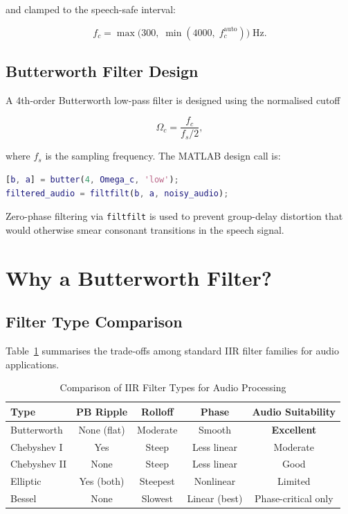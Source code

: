 \documentclass[conference]{IEEEtran}
\begin{document}
and clamped to the speech-safe interval:

\begin{equation}
  f_c = \max\bigl(300,\;\min(4000,\;f_c^{\text{auto}})\bigr)\;\text{Hz}.
  \label{eq:clamp}
\end{equation}

\subsection{Butterworth Filter Design}

A 4th-order Butterworth low-pass filter is designed using the normalised
cutoff

\begin{equation}
  \Omega_c = \frac{f_c}{f_s / 2},
  \label{eq:normalised}
\end{equation}

where $f_s$ is the sampling frequency. The MATLAB design call is:

\begin{lstlisting}[language=Matlab, caption={Butterworth filter design in MATLAB.}]
[b, a] = butter(4, Omega_c, 'low');
filtered_audio = filtfilt(b, a, noisy_audio);
\end{lstlisting}

Zero-phase filtering via \texttt{filtfilt} is used to prevent group-delay
distortion that would otherwise smear consonant transitions in the speech
signal.

\section{Why a Butterworth Filter?}

\subsection{Filter Type Comparison}

Table~\ref{tab:filters} summarises the trade-offs among standard IIR filter
families for audio applications.

\begin{table}[htbp]
\caption{Comparison of IIR Filter Types for Audio Processing}
\label{tab:filters}
\centering
\begin{tabular}{lcccc}
\toprule
\textbf{Type} & \textbf{PB Ripple} & \textbf{Rolloff} & \textbf{Phase} & \textbf{Audio Suitability} \\
\midrule
Butterworth   & None (flat)  & Moderate  & Smooth        & \textbf{Excellent} \\
Chebyshev I   & Yes          & Steep     & Less linear   & Moderate \\
Chebyshev II  & None         & Steep     & Less linear   & Good \\
Elliptic      & Yes (both)   & Steepest  & Nonlinear     & Limited \\
Bessel        & None         & Slowest   & Linear (best) & Phase-critical only \\
\bottomrule
\end{tabular}
\end{table}
\end{document}

